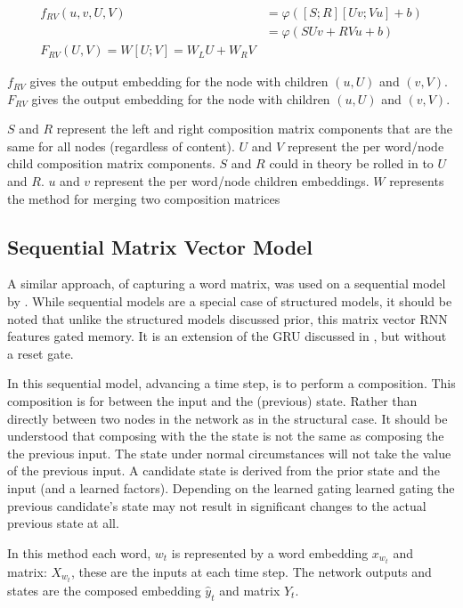 \documentclass[12pt,parskip]{komatufte}
\begin{document}
\begin{align}
f_{RV}(u, v, U, V) &= \varphi\left( [S;R][Uv;Vu] + b \right) \\ 
&= \varphi\left( SUv +RVu + b \right)\\
F_{RV}(U, V) = W[U;V] = W_L U + W_R V
\end{align}

$f_{RV}$ gives the output embedding for the node with children $(u,U)$ and $(v,V)$.
$F_{RV}$ gives the output embedding for the node with children $(u,U)$ and $(v,V)$.

$S$ and $R$ represent the left and right composition matrix components that are the same for all nodes (regardless of content).
$U$ and $V$ represent the per word/node child composition matrix components.
$S$ and $R$ could in theory be rolled in to $U$ and $R$.
$u$ and $v$ represent the per word/node children embeddings.
$W$ represents the method for merging two composition matrices






\subsection{Sequential Matrix Vector Model}
A similar approach, of capturing a word matrix, 
was used on a sequential model by .
While sequential models are a special case of structured models,
it should be noted that unlike the structured models discussed prior,
this matrix vector RNN features gated memory.
It is an extension of the GRU discussed in , but without a reset gate.


In this sequential model, advancing a time step, is to perform a composition.
This composition is for between the input and the (previous) state.
Rather than directly between two nodes in the network as in the structural case.
It should be understood that composing with the the state is not the same as composing the the previous input.
The state under normal circumstances will not take the value of the previous input.
A candidate state is derived from the prior state and the input (and a learned factors).
Depending on the learned gating learned gating the previous candidate's state may not result in significant changes to the actual previous state at all.


In this method each word, $w_t$ is represented by a word embedding $x_{w_t}$ and matrix: $X_{w_t}$, these are the inputs at each time step.
The network outputs and states are the composed embedding $\hat{y}_t$ and matrix $Y_t$.
\end{document}
